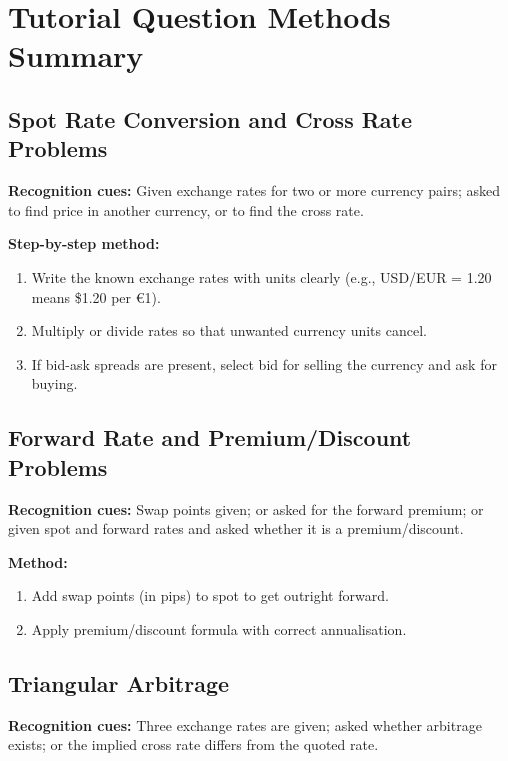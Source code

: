 \documentclass[11pt,a4paper]{article}
\begin{document}
\newpage

\section{Tutorial Question Methods Summary}

\subsection{Spot Rate Conversion and Cross Rate Problems}

\textbf{Recognition cues:} Given exchange rates for two or more currency pairs; asked to find price in another currency, or to find the cross rate.

\textbf{Step-by-step method:}
\begin{enumerate}
  \item Write the known exchange rates with units clearly (e.g., USD/EUR = 1.20 means \$1.20 per €1).
  \item Multiply or divide rates so that unwanted currency units cancel.
  \item If bid-ask spreads are present, select bid for selling the currency and ask for buying.
\end{enumerate}

\subsection{Forward Rate and Premium/Discount Problems}

\textbf{Recognition cues:} Swap points given; or asked for the forward premium; or given spot and forward rates and asked whether it is a premium/discount.

\textbf{Method:}
\begin{enumerate}
  \item Add swap points (in pips) to spot to get outright forward.
  \item Apply premium/discount formula with correct annualisation.
\end{enumerate}

\subsection{Triangular Arbitrage}

\textbf{Recognition cues:} Three exchange rates are given; asked whether arbitrage exists; or the implied cross rate differs from the quoted rate.
\end{document}
